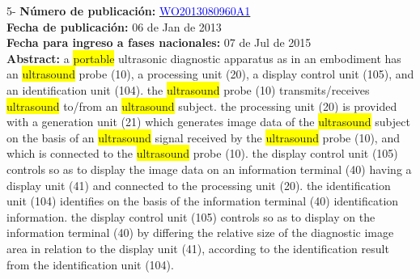  \vspace{1cm}5- \textbf{Número de publicación:} \href{https://worldwide.espacenet.com/publicationDetails/biblio?DB=EPODOC&II=0&ND=3&adjacent=true&locale=en_EP&FT=D&date=20160331&CC=WO&NR=2013080960A1&KC=A1#}{\textcolor{blue}{WO2013080960A1}}\\ 
\textbf{Fecha de publicación:} 06 de Jan de 2013\\ 
\textbf{Fecha para ingreso a fases nacionales:} 07 de Jul de 2015\\ 
\textbf{Abstract:} a \colorbox{yellow}{\colorbox{yellow}{portable}} ultrasonic diagnostic apparatus as in an embodiment has an \colorbox{yellow}{ultrasound} probe (10), a processing unit (20), a display control unit (105), and an identification unit (104). the \colorbox{yellow}{ultrasound} probe (10) transmits/receives \colorbox{yellow}{ultrasound} to/from an \colorbox{yellow}{ultrasound} subject. the processing unit (20) is provided with a generation unit (21) which generates image data of the \colorbox{yellow}{ultrasound} subject on the basis of an \colorbox{yellow}{ultrasound} signal received by the \colorbox{yellow}{ultrasound} probe (10), and which is connected to the \colorbox{yellow}{ultrasound} probe (10). the display control unit (105) controls so as to display the image data on an information terminal (40) having a display unit (41) and connected to the processing unit (20). the identification unit (104) identifies on the basis of the information terminal (40) identification information. the display control unit (105) controls so as to display on the information terminal (40) by differing the relative size of the diagnostic image area in relation to the display unit (41), according to the identification result from the identification unit (104).\\ 
 

